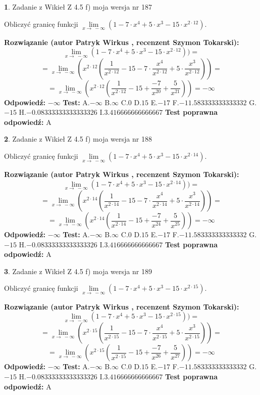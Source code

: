 \documentclass[12pt, a4paper]{article}
\theoremstyle{definition} %
\newtheorem{zad}{}
\newcommand{\zadStart}[1]{\begin{zad}#1\newline}
\newcommand{\zadStop}{\end{zad}}
\newcommand{\rozwStart}[2]{\noindent \textbf{Rozwiązanie (autor #1 , recenzent #2): }\newline}
\newcommand{\rozwStop}{\newline}
\newcommand{\odpStart}{\noindent \textbf{Odpowiedź:}\newline}
\newcommand{\odpStop}{\newline}
\newcommand{\testStart}{\noindent \textbf{Test:}\newline}
\newcommand{\testStop}{\newline}
\newcommand{\kluczStart}{\noindent \textbf{Test poprawna odpowiedź:}\newline}
\newcommand{\kluczStop}{\newline}
\begin{document}
\zadStart{Zadanie z Wikieł Z 4.5 f) moja wersja nr 187}


Obliczyć granicę funkcji  $\lim\limits_{x\to\ -\infty}(1 - 7 \cdot x^{4}+5 \cdot x^{3}- 15 \cdot x^{2\cdot12})$.
\zadStop
\rozwStart{Patryk Wirkus}{Szymon Tokarski}
$$\lim\limits_{x\to\ -\infty}(1 - 7 \cdot x^{4}+5 \cdot x^{3}- 15 \cdot x^{2\cdot12}))=$$
$$=\lim\limits_{x\to\ -\infty}(x^{2\cdot12}(\frac{1}{x^{2\cdot12}}-15 -7 \cdot \frac{x^{4}}{x^{2\cdot12}}+5 \cdot \frac{x^{3}}{x^{2\cdot12}}))=$$
$$=\lim\limits_{x\to\ -\infty}(x^{2\cdot12}(\frac{1}{x^{2\cdot12}}-15 + \frac{-7}{x^{20}}+ \frac{5}{x^{21}}))=-\infty$$
\rozwStop
\odpStart
$-\infty$
\odpStop
\testStart
A.$-\infty$ B.$\infty$ C.$0$ D.$15$ E.$-17$
F.$-11.583333333333332$ G.$-15$
H.$-0.08333333333333326$
I.$3.416666666666667$
\testStop
\kluczStart
A
\kluczStop



\zadStart{Zadanie z Wikieł Z 4.5 f) moja wersja nr 188}


Obliczyć granicę funkcji  $\lim\limits_{x\to\ -\infty}(1 - 7 \cdot x^{4}+5 \cdot x^{3}- 15 \cdot x^{2\cdot14})$.
\zadStop
\rozwStart{Patryk Wirkus}{Szymon Tokarski}
$$\lim\limits_{x\to\ -\infty}(1 - 7 \cdot x^{4}+5 \cdot x^{3}- 15 \cdot x^{2\cdot14}))=$$
$$=\lim\limits_{x\to\ -\infty}(x^{2\cdot14}(\frac{1}{x^{2\cdot14}}-15 -7 \cdot \frac{x^{4}}{x^{2\cdot14}}+5 \cdot \frac{x^{3}}{x^{2\cdot14}}))=$$
$$=\lim\limits_{x\to\ -\infty}(x^{2\cdot14}(\frac{1}{x^{2\cdot14}}-15 + \frac{-7}{x^{24}}+ \frac{5}{x^{25}}))=-\infty$$
\rozwStop
\odpStart
$-\infty$
\odpStop
\testStart
A.$-\infty$ B.$\infty$ C.$0$ D.$15$ E.$-17$
F.$-11.583333333333332$ G.$-15$
H.$-0.08333333333333326$
I.$3.416666666666667$
\testStop
\kluczStart
A
\kluczStop



\zadStart{Zadanie z Wikieł Z 4.5 f) moja wersja nr 189}


Obliczyć granicę funkcji  $\lim\limits_{x\to\ -\infty}(1 - 7 \cdot x^{4}+5 \cdot x^{3}- 15 \cdot x^{2\cdot15})$.
\zadStop
\rozwStart{Patryk Wirkus}{Szymon Tokarski}
$$\lim\limits_{x\to\ -\infty}(1 - 7 \cdot x^{4}+5 \cdot x^{3}- 15 \cdot x^{2\cdot15}))=$$
$$=\lim\limits_{x\to\ -\infty}(x^{2\cdot15}(\frac{1}{x^{2\cdot15}}-15 -7 \cdot \frac{x^{4}}{x^{2\cdot15}}+5 \cdot \frac{x^{3}}{x^{2\cdot15}}))=$$
$$=\lim\limits_{x\to\ -\infty}(x^{2\cdot15}(\frac{1}{x^{2\cdot15}}-15 + \frac{-7}{x^{26}}+ \frac{5}{x^{27}}))=-\infty$$
\rozwStop
\odpStart
$-\infty$
\odpStop
\testStart
A.$-\infty$ B.$\infty$ C.$0$ D.$15$ E.$-17$
F.$-11.583333333333332$ G.$-15$
H.$-0.08333333333333326$
I.$3.416666666666667$
\testStop
\kluczStart
A
\kluczStop
\end{document}

